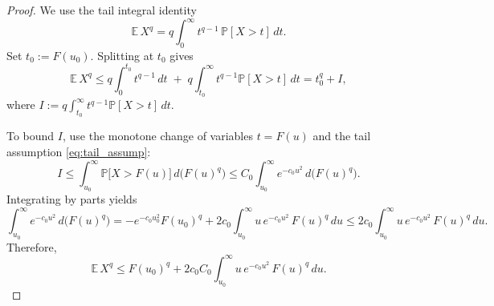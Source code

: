 \documentclass[numbers,webpdf,imaiai]{ima-authoring-template}
\theoremstyle{thmstyletwo}%
\numberwithin{equation}{section}
\numberwithin{equation}{section}
\newcommand{\E}{\mathbb{E}}
\begin{document}
\begin{appendix}
\begin{proof}
We use the tail integral identity
\begin{equation*}
\E\, X^q = q\int_{0}^{\infty} t^{q-1}\,\mathbb P [X>t]\,dt.
\end{equation*}
Set $t_0:=F(u_0)$. Splitting at $t_0$ gives
\[
\mathbb E\, X^q
\le q\int_0^{t_0} t^{q-1}\,dt \;+\; q\int_{t_0}^{\infty} t^{q-1}\mathbb P[X>t]\,dt
= t_0^q + I,
\]
where $I:=q\int_{t_0}^{\infty} t^{q-1}\mathbb P[X>t]\,dt$.

To bound $I$, use the monotone change of variables $t=F(u)$ and the tail assumption \eqref{eq:tail_assump}:
\[
I
\le \int_{u_0}^{\infty}\mathbb P\big[X>F(u)\big]\,d\!\big(F(u)^q\big)
\le C_0\int_{u_0}^{\infty}e^{-c_0u^2}\,d\!\big(F(u)^q\big).
\]
Integrating by parts yields
\[
\int_{u_0}^{\infty}e^{-c_0u^2}\,d\!\big(F(u)^q\big)
= -e^{-c_0 u_0^2} F(u_0)^q+ 2c_0\int_{u_0}^{\infty}u\,e^{-c_0u^2}\,F(u)^q\,du\le 2c_0\int_{u_0}^{\infty}u\,e^{-c_0u^2}\,F(u)^q\,du.
\]
Therefore,
\begin{equation}\label{eq:moment_reduce}
\E\, X^q \le F(u_0)^q + 2c_0C_0\int_{u_0}^{\infty}u\,e^{-c_0u^2}\,F(u)^q\,du.
\end{equation}



\end{proof}
\end{appendix}
\end{document}
